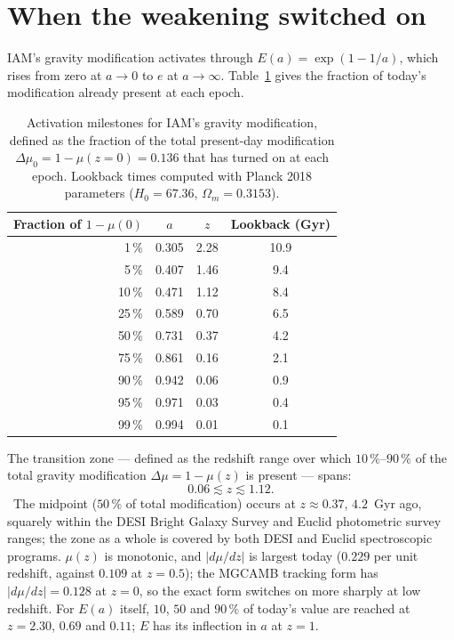 \section{When the weakening switched on}\label{sec:sp_transition}
IAM's gravity modification activates through $E(a)=\exp(1-1/a)$, which rises from zero at $a\to0$ to $e$ at $a\to\infty$.
Table~\ref{tab:sp_activation} gives the fraction of today's modification already present at each epoch. \calc
\begin{table}[htbp]\centering\small
\caption{Activation milestones for IAM's gravity modification, defined as the fraction of the total present-day modification
$\Delta\mu_0=1-\mu(z{=}0)=0.136$ that has turned on at each epoch. Lookback times computed with Planck 2018 parameters ($H_0=67.36$,
$\Omega_m=0.3153$). \calc}\label{tab:sp_activation}
\begin{tabular}{rccc}\toprule
Fraction of $1-\mu(0)$ & $a$ & $z$ & Lookback (Gyr)\\\midrule
1\,\% & 0.305 & 2.28 & 10.9\\ 5\,\% & 0.407 & 1.46 & 9.4\\ 10\,\% & 0.471 & 1.12 & 8.4\\ 25\,\% & 0.589 & 0.70 & 6.5\\
50\,\% & 0.731 & 0.37 & 4.2\\ 75\,\% & 0.861 & 0.16 & 2.1\\ 90\,\% & 0.942 & 0.06 & 0.9\\ 95\,\% & 0.971 & 0.03 & 0.4\\
99\,\% & 0.994 & 0.01 & 0.1\\\bottomrule
\end{tabular}\end{table}
The transition zone --- defined as the redshift range over which $10\,\%$--$90\,\%$ of the total gravity modification $\Delta\mu=1-\mu(z)$ is
present --- spans:
\begin{equation}0.06\lesssim z\lesssim1.12 .\label{eq:sp_zone}\end{equation}
\calc\ The midpoint ($50\,\%$ of total modification) occurs at $z\approx0.37$, $4.2$~Gyr ago, squarely within the DESI Bright Galaxy Survey and
Euclid photometric survey ranges; the zone as a whole is covered by both DESI and Euclid spectroscopic programs. $\mu(z)$ is monotonic, and $|d\mu/dz|$ is largest today ($0.229$ per unit redshift, against
$0.109$ at $z=0.5$); the MGCAMB tracking form has $|d\mu/dz|=0.128$ at $z=0$, so the exact form switches on more sharply at low redshift. For $E(a)$
itself, $10$, $50$ and $90\,\%$ of today's value are reached at $z=2.30$, $0.69$ and $0.11$; $E$ has its inflection in $a$ at $z=1$. \calc
